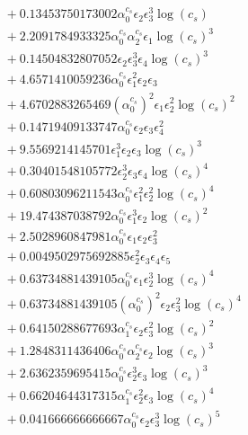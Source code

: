 \documentclass[10pt]{article}
\begin{document}
\begin{align*}
&{}  + 0.13453750173002 \alpha_{0}^{c_s} \epsilon_{2} \epsilon_{3}^{3} \log{\left(c_{s} \right)} \\
&{}  + 2.2091784933325 \alpha_{0}^{c_s} \alpha_{2}^{c_s} \epsilon_{1} \log{\left(c_{s} \right)}^{3} \\
&{}  + 0.14504832807052 \epsilon_{2} \epsilon_{3}^{3} \epsilon_{4} \log{\left(c_{s} \right)}^{3} \\
&{}  + 4.6571410059236 \alpha_{0}^{c_s} \epsilon_{1}^{2} \epsilon_{2} \epsilon_{3} \\
&{}  + 4.6702883265469 \left(\alpha_{0}^{c_s}\right)^{2} \epsilon_{1} \epsilon_{2}^{2} \log{\left(c_{s} \right)}^{2} \\
&{}  + 0.14719409133747 \alpha_{0}^{c_s} \epsilon_{2} \epsilon_{3} \epsilon_{4}^{2} \\
&{}  + 9.5569214145701 \epsilon_{1}^{3} \epsilon_{2} \epsilon_{3} \log{\left(c_{s} \right)}^{3} \\
&{}  + 0.30401548105772 \epsilon_{2}^{3} \epsilon_{3} \epsilon_{4} \log{\left(c_{s} \right)}^{4} \\
&{}  + 0.60803096211543 \alpha_{0}^{c_s} \epsilon_{1}^{2} \epsilon_{2}^{2} \log{\left(c_{s} \right)}^{4} \\
&{}  + 19.474387038792 \alpha_{0}^{c_s} \epsilon_{1}^{3} \epsilon_{2} \log{\left(c_{s} \right)}^{2} \\
&{}  + 2.5028960847981 \alpha_{0}^{c_s} \epsilon_{1} \epsilon_{2} \epsilon_{3}^{2} \\
&{}  + 0.0049502975692885 \epsilon_{2}^{2} \epsilon_{3} \epsilon_{4} \epsilon_{5} \\
&{}  + 0.63734881439105 \alpha_{0}^{c_s} \epsilon_{1} \epsilon_{2}^{3} \log{\left(c_{s} \right)}^{4} \\
&{}  + 0.63734881439105 \left(\alpha_{0}^{c_s}\right)^{2} \epsilon_{2} \epsilon_{3}^{2} \log{\left(c_{s} \right)}^{4} \\
&{}  + 0.64150288677693 \alpha_{1}^{c_s} \epsilon_{2} \epsilon_{3}^{2} \log{\left(c_{s} \right)}^{2} \\
&{}  + 1.2848311436406 \alpha_{0}^{c_s} \alpha_{2}^{c_s} \epsilon_{2} \log{\left(c_{s} \right)}^{3} \\
&{}  + 2.6362359695415 \alpha_{0}^{c_s} \epsilon_{2}^{3} \epsilon_{3} \log{\left(c_{s} \right)}^{3} \\
&{}  + 0.66204644317315 \alpha_{1}^{c_s} \epsilon_{2}^{2} \epsilon_{3} \log{\left(c_{s} \right)}^{4} \\
&{}  + 0.041666666666667 \alpha_{0}^{c_s} \epsilon_{2} \epsilon_{3}^{3} \log{\left(c_{s} \right)}^{5} \\

\end{align*}
\end{document}
